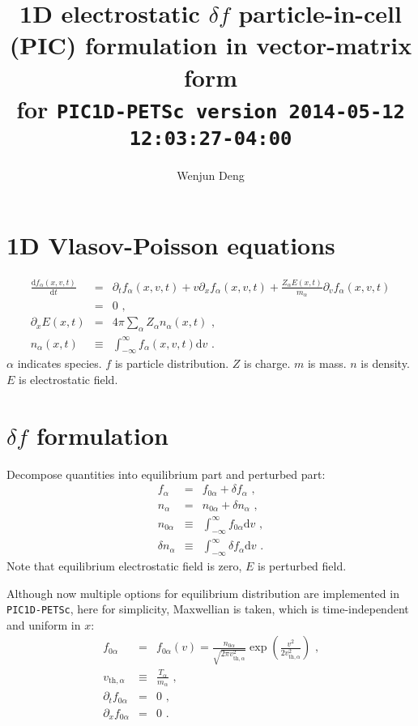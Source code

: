 \documentclass[12pt]{article}
\begin{document}
\newcommand{\rmd}{\mathrm{d}}

\title{1D electrostatic $\delta f$ particle-in-cell (PIC) formulation in vector-matrix form \\
\large for \texttt{PIC1D-PETSc version 2014-05-12 12:03:27-04:00}}
\author{Wenjun Deng}
\maketitle


\section{1D Vlasov-Poisson equations}

\begin{eqnarray}
	\frac{\rmd f_\alpha(x, v, t)}{\rmd t} & = & \partial_t f_\alpha(x, v, t) + v \partial_x f_\alpha(x, v, t) + \frac{Z_\alpha E(x, t)}{m_\alpha} \partial_v f_\alpha(x, v, t) \nonumber \\
	& = & 0 \textrm{ ,} \\
	\partial_x E(x, t) & = & 4 \pi \sum_\alpha Z_\alpha n_\alpha(x, t) \textrm{ ,} \\
	n_\alpha(x, t) & \equiv & \int_{-\infty}^{\infty} f_\alpha(x, v, t) \rmd v \textrm{ .}
\end{eqnarray}
$\alpha$ indicates species.
$f$ is particle distribution.
$Z$ is charge.
$m$ is mass.
$n$ is density.
$E$ is electrostatic field.


\section{$\delta f$ formulation}

Decompose quantities into equilibrium part and perturbed part:
\begin{eqnarray}
	f_\alpha & = & f_{0 \alpha} + \delta f_\alpha \textrm{ ,} \\
	n_\alpha & = & n_{0 \alpha} + \delta n_\alpha \textrm{ ,} \\
	n_{0 \alpha} & \equiv & \int_{-\infty}^{\infty} f_{0 \alpha} \rmd v \textrm{ ,} \\
	\delta n_{\alpha} & \equiv & \int_{-\infty}^{\infty} \delta f_{\alpha} \rmd v \textrm{ .}
\end{eqnarray}
Note that equilibrium electrostatic field is zero, $E$ is perturbed field.

Although now multiple options for equilibrium distribution are implemented in \texttt{PIC1D-PETSc}, here for simplicity, Maxwellian is taken, which is time-independent and uniform in $x$:
\begin{eqnarray}
	f_{0 \alpha} & = & f_{0 \alpha}(v) = \frac{n_{0 \alpha}}{\sqrt{2 \pi v_{\mathrm{th}, \alpha}^2}} \exp \left( \frac{v^2}{2 v_{\mathrm{th}, \alpha}^2} \right) \textrm{ ,} \\
	v_{\mathrm{th}, \alpha} & \equiv & \frac{T_\alpha}{m_\alpha} \textrm{ ,} \\
	\partial_t f_{0 \alpha} & = & 0 \textrm{ ,} \\
	\partial_x f_{0 \alpha} & = & 0 \textrm{ .}
\end{eqnarray}
\end{document}
